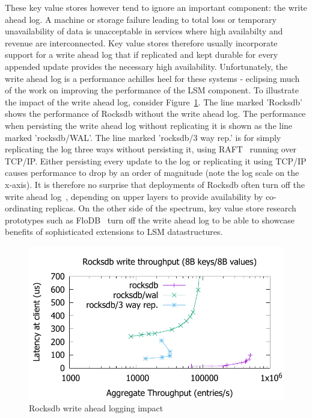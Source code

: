 \documentclass[pageno]{jpaper}
\begin{document}
These key value stores however tend to ignore an important component: the write
ahead log. A machine or storage failure leading to total loss or temporary
unavailability of data is unacceptable in services where high availabilty and
revenue are interconnected. Key value stores therefore usually incorporate
support for a write ahead log that if replicated and kept durable for every
appended update provides the necessary high availability. Unfortunately, the
write ahead log is a performance achilles heel for these systems - eclipsing
much of the work on improving the performance of the LSM component. To
illustrate the impact of the write ahead log, consider
Figure~\ref{fig:problem}. The line marked 'Rocksdb' shows the performance of
Rocksdb without the write ahead log. The performance when persisting the write
ahead log without replicating it is shown as the line marked 'rocksdb/WAL'. The
line marked 'rocksdb/3 way rep.' is for simply replicating the log three ways
without persisting it, using RAFT~\cite{raft} running over TCP/IP. Either
persisting every update to the log or replicating it using TCP/IP causes
performance to drop by an order of magnitude (note the log scale on the
x-axis). It is therefore no surprise that deployments of Rocksdb often turn off
the write ahead log~\cite{samza}, depending on upper layers to provide
availability by co-ordinating replicas. On the other side of the spectrum, key
value store research prototypes such as FloDB~\cite{flodb} turn off the write
ahead log to be able to showcase benefits of sophisticated extensions to LSM
datastructures.


\begin{figure}
\centering \includegraphics[scale=0.6]{results2/problem.pdf}
\caption{Rocksdb write ahead logging impact}
\label{fig:problem}
\end{figure}
\end{document}
